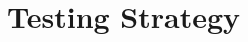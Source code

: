 \documentclass[../../../../main.tex]{subfiles}
\begin{document}
\section{Testing Strategy}

\newpage
\end{document}
